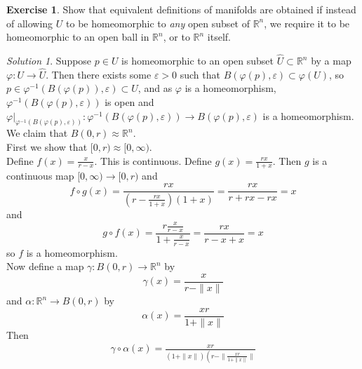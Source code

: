 \documentclass[reqno]{amsart}
\theoremstyle{plain}%
\theoremstyle{definition}
\newtheorem{exercise}[theorem]{Exercise}
\theoremstyle{remark}
\newtheorem*{solution}{Solution}
\begin{document}
        \begin{exercise}
            Show that equivalent definitions of manifolds are
        obtained if instead of allowing $U$ to be homeomorphic to \textit{any} open
        subset of $\mathbb{R}^{n}$, we require it to be homeomorphic to an open ball in
        $\mathbb{R}^{n}$, or to $\mathbb{R}^{n}$ itself.
        \end{exercise} 
        \begin{solution}
            Suppose $p \in U$ is homeomorphic to an open subset
        $\hat{U} \subset \mathbb{R}^{n}$ by a map $\varphi  \colon U \to \hat{U}$. Then
        there exists some $ \varepsilon > 0$
         such that $B\left( \varphi(p),\varepsilon \right) \subset 
         \varphi(U)$, so
         $p \in \varphi^{-1}\left( B \left( \varphi(p) \right) ,\varepsilon \right) 
         \subset U$, and as $\varphi$ is a homeomorphism, 
         $\varphi^{-1}\left( B\left( \varphi(p),\varepsilon \right)  \right) $ is open
         and
         $\varphi|_{\varphi^{-1}\left( B\left( \varphi(p),\varepsilon \right)  \right) }
          \colon \varphi^{-1}\left( B\left( \varphi(p),\varepsilon \right)  \right) 
          \to B\left( \varphi(p),\varepsilon \right) $ is a homeomorphism.\\
          We claim that $B\left( 0, r \right) \approx \mathbb{R}^{n} $.\\
          First we show that $[0,r) \approx [0,\infty) $.\\
           Define $f(x) = \frac{x}{r-x}$. This is continuous. Define
          $g(x) = \frac{rx}{1+x}$. Then
          $g$ is a continuous map $[0, \infty) \to [0,r)$ and
          \[
          f \circ g(x) =
          \frac{rx}{(r- \frac{rx}{1+x}) (1+x)} = 
          \frac{rx}{r+rx - rx} = x
          \] 
          and
           \[
          g \circ f(x) = \frac{r \frac{x}{r-x}}{1+ \frac{x}{r-x}}
          = \frac{rx}{r-x+x} = x
          \] 
          so $f$ is a homeomorphism.\\
          \linebreak
          Now define a map
          $\gamma  \colon B\left( 0,r \right) \to \mathbb{R}^{n}$ by
          \[
          \gamma \left( x \right) 
          = \frac{x }{r - \|x\|}
          \] 
          and
          $\alpha  \colon \mathbb{R}^{n} \to B\left( 0,r \right) $ by
          \[
          \alpha(x) = \frac{x r }{1+ \|x\|}
          \] 
          Then
          \begin{align*}
              \gamma \circ \alpha(x)
              = \frac{xr}{\left( 1+ \|x\| \right) \left( r- \|\frac{xr}{1+ \|x\|}\|
}
\end{align*}
\end{solution}
\end{document}
